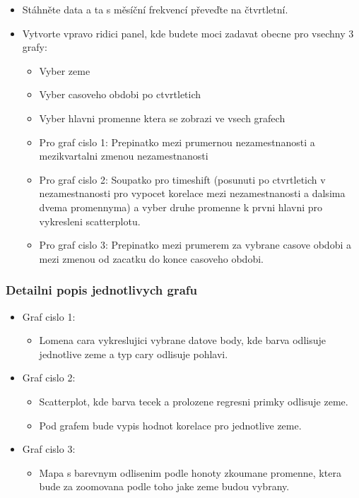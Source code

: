 \documentclass[
]{article}
\providecommand{\tightlist}{%
  \setlength{\itemsep}{0pt}\setlength{\parskip}{0pt}}
\begin{document}
\begin{itemize}
\item
  Stáhněte data a ta s měsíční frekvencí převeďte na čtvrtletní.
\item
  Vytvorte vpravo ridici panel, kde budete moci zadavat obecne pro
  vsechny 3 grafy:

  \begin{itemize}
  \tightlist
  \item
    Vyber zeme
  \item
    Vyber casoveho obdobi po ctvrtletich
  \item
    Vyber hlavni promenne ktera se zobrazi ve vsech grafech
  \item
    Pro graf cislo 1: Prepinatko mezi prumernou nezamestnanosti a
    mezikvartalni zmenou nezamestnanosti
  \item
    Pro graf cislo 2: Soupatko pro timeshift (posunuti po ctvrtletich v
    nezamestnanosti pro vypocet korelace mezi nezamestnanosti a dalsima
    dvema promennyma) a vyber druhe promenne k prvni hlavni pro
    vykresleni scatterplotu.
  \item
    Pro graf cislo 3: Prepinatko mezi prumerem za vybrane casove obdobi
    a mezi zmenou od zacatku do konce casoveho obdobi.
  \end{itemize}
\end{itemize}

\hypertarget{detailni-popis-jednotlivych-grafu}{%
\subsubsection{Detailni popis jednotlivych
grafu}\label{detailni-popis-jednotlivych-grafu}}

\begin{itemize}
\tightlist
\item
  Graf cislo 1:

  \begin{itemize}
  \tightlist
  \item
    Lomena cara vykreslujici vybrane datove body, kde barva odlisuje
    jednotlive zeme a typ cary odlisuje pohlavi.
  \end{itemize}
\item
  Graf cislo 2:

  \begin{itemize}
  \tightlist
  \item
    Scatterplot, kde barva tecek a prolozene regresni primky odlisuje
    zeme.
  \item
    Pod grafem bude vypis hodnot korelace pro jednotlive zeme.
  \end{itemize}
\item
  Graf cislo 3:

  \begin{itemize}
  \tightlist
  \item
    Mapa s barevnym odlisenim podle honoty zkoumane promenne, ktera bude
    za zoomovana podle toho jake zeme budou vybrany.
  \end{itemize}
\end{itemize}
\end{document}
